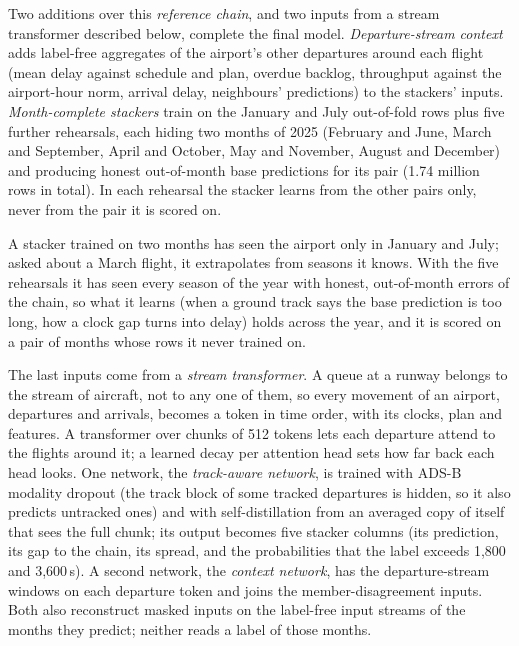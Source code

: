 \documentclass[
  manuscript=article,
  layout=preprint,
  year=2026,
  volume=x,
]{extra/joas}
\begin{document}
Two additions over this \emph{reference chain}, and two inputs from a stream transformer described below, complete the final model. \emph{Departure-stream context} adds label-free
aggregates of the airport's other departures around each flight (mean delay against schedule and plan, overdue backlog, throughput
against the airport-hour norm, arrival delay, neighbours' predictions) to the stackers' inputs. \emph{Month-complete stackers}
train on the January and July out-of-fold rows plus five further rehearsals, each hiding two months of 2025 (February and June, March
and September, April and October, May and November, August and December) and producing honest out-of-month base predictions for its
pair (1.74 million rows in total). In each rehearsal the stacker learns from the other pairs only, never from the pair it is scored on.

A stacker trained on two months has seen the airport only in January and July; asked about a March flight, it extrapolates from
seasons it knows. With the five rehearsals it has seen every season of the year with
honest, out-of-month errors of the chain, so what it learns (when a ground track says the base prediction is too long, how a clock gap
turns into delay) holds across the year, and it is scored on a pair of months whose rows it never trained on.

The last inputs come from a \emph{stream transformer}. A queue at a runway belongs to the stream of aircraft, not to any
one of them, so every movement of an airport, departures and arrivals, becomes a token in time order, with its clocks, plan and features.
A transformer over chunks of 512 tokens lets each departure attend to the flights around it; a learned decay per attention head sets how
far back each head looks. One network, the \emph{track-aware network}, is trained with ADS-B modality dropout (the track block
of some tracked departures is hidden, so it also predicts untracked ones) and with self-distillation from an averaged copy of itself
that sees the full chunk; its output becomes five stacker columns (its prediction, its gap to the chain, its spread, and the
probabilities that the label exceeds 1,800 and 3,600\,s). A second network, the \emph{context network}, has the departure-stream windows on each
departure token and joins the member-disagreement inputs. Both also reconstruct masked inputs on the label-free input streams of the
months they predict; neither reads a label of those months.
\end{document}
